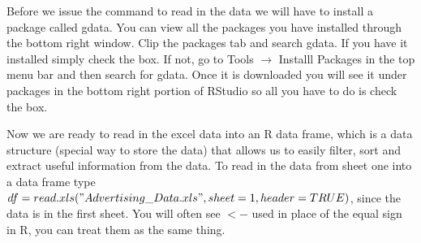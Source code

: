 \documentclass[11pt]{article}
\begin{document}
Before we issue the command to read in the data we will have to install a package called gdata. You can view all the packages you have installed through the bottom right window.  Clip the packages tab and search gdata.  If you have it installed simply check the box. If not, go to Tools $\rightarrow$ Installl Packages in the top menu bar and then search for gdata.  Once it is downloaded you will see it under packages in the bottom right portion of RStudio so all you have to do is check the box. 

Now we are ready to read in the excel data into an R data frame, which is a data structure (special way to store the data) that allows us to easily filter, sort and extract useful information from the data.  To read in the data from sheet one into a data frame type $ df = read.xls ("Advertising\_Data.xls", sheet = 1, header = TRUE)$, since the data is in the first sheet.  You will often see $<-$ used in place of the equal sign in R, you can treat them as the same thing.  %
\end{document}
